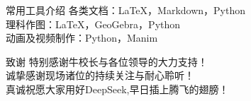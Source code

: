 \documentclass{ctexbeamer}
\begin{document}
\begin{frame}[t]{常用工具介绍}
\fontsize{14pt}{18pt}\selectfont
各类文档：LaTeX，Markdown，Python \\
理科作图：LaTeX，GeoGebra，Python \\
动画及视频制作：Python，Manim \\
\end{frame}

\begin{frame}[t]{致谢}
\centering
\fontsize{14pt}{18pt}\selectfont
\vspace*{1.6cm}
特别感谢牛校长与各位领导的大力支持！\\
\vspace*{0.4cm}
诚挚感谢现场诸位的持续关注与耐心聆听！\\
\vspace*{0.4cm}
真诚祝愿大家用好DeepSeek,早日插上腾飞的翅膀！
\end{frame}
\end{document}
